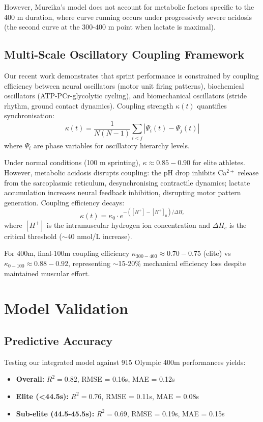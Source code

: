 \documentclass[12pt,a4paper]{article}
\begin{document}
However, Mureika's model does not account for metabolic factors specific to the 400 m duration, where curve running occurs under progressively severe acidosis (the second curve at the 300-400 m point when lactate is maximal).

\subsection{Multi-Scale Oscillatory Coupling Framework}

Our recent work \citep{AuthorYear} demonstrates that sprint performance is constrained by coupling efficiency between neural oscillators (motor unit firing patterns), biochemical oscillators (ATP-PCr-glycolytic cycling), and biomechanical oscillators (stride rhythm, ground contact dynamics). Coupling strength $\kappa(t)$ quantifies synchronisation:
\begin{equation}
\kappa(t) = \frac{1}{N(N-1)} \sum_{i<j} |\Psi_i(t) - \Psi_j(t)|
\end{equation}
where $\Psi_i$ are phase variables for oscillatory hierarchy levels.

Under normal conditions (100 m sprinting), $\kappa \approx 0.85-0.90$ for elite athletes. However, metabolic acidosis disrupts coupling: the pH drop inhibits Ca$^{2+}$ release from the sarcoplasmic reticulum, desynchronising contractile dynamics; lactate accumulation increases neural feedback inhibition, disrupting motor pattern generation. Coupling efficiency decays:
\begin{equation}
\kappa(t) = \kappa_0 \cdot e^{-([H^+] - [H^+]_0) / \Delta H_c}
\end{equation}
where $[H^+]$ is the intramuscular hydrogen ion concentration and $\Delta H_c$ is the critical threshold ($\sim$40 nmol/L increase).

For 400m, final-100m coupling efficiency $\kappa_{300-400} \approx 0.70-0.75$ (elite) vs $\kappa_{0-100} \approx 0.88-0.92$, representing $\sim$15-20\% mechanical efficiency loss despite maintained muscular effort.

\section{Model Validation}

\subsection{Predictive Accuracy}

Testing our integrated model against 915 Olympic 400m performances yields:
\begin{itemize}
    \item \textbf{Overall:} $R^2 = 0.82$, RMSE = 0.16s, MAE = 0.12s
    \item \textbf{Elite (<44.5s):} $R^2 = 0.76$, RMSE = 0.11s, MAE = 0.08s
    \item \textbf{Sub-elite (44.5-45.5s):} $R^2 = 0.69$, RMSE = 0.19s, MAE = 0.15s
\end{itemize}
\end{document}
